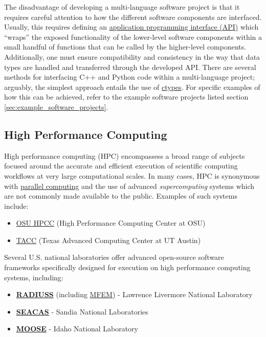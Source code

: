 \documentclass[12pt,a4paper,article,oneside]{memoir} %
\begin{document}
The disadvantage of developing a multi-language software project is that it requires careful attention to how the different software components are interfaced. Usually, this requires defining an \href{https://en.wikipedia.org/wiki/API}{application programming interface (API)} which ``wraps'' the exposed functionality of the lower-level software components within a small handful of functions that can be called by the higher-level components. Additionally, one must ensure compatibility and consistency in the way that data types are handled and transferred through the developed API. There are several methods for interfacing C++ and Python code within a multi-language project; arguably, the simplest approach entails the use of \href{https://docs.python.org/3/library/ctypes.html}{ctypes}. For specific examples of how this can be achieved, refer to the example software projects listed section \ref{sec:example_software_projects}.

\subsection{High Performance Computing}

High performance computing (HPC) encompassess a broad range of subjects focused around the accurate and efficient execution of scientific computing workflows at very large computational scales. In many cases, HPC is synonymous with \href{https://hpc.llnl.gov/documentation/tutorials/introduction-parallel-computing-tutorial}{parallel computing} and the use of advanced \textit{supercomputing} systems which are not commonly made available to the public. Examples of such systems include:
\begin{itemize}
\item \href{https://hpcc.okstate.edu}{OSU HPCC} (High Performance Computing Center at OSU)
\item \href{https://tacc.utexas.edu}{TACC} (Texas Advanced Computing Center at UT Austin)
\end{itemize}

Several U.S. national laboratories offer advanced open-source software frameworks specifically designed for execution on high performance computing systems, including:
\begin{itemize}
\item \href{https://software.llnl.gov/radiuss/}{\textbf{RADIUSS}} (including \href{https://mfem.org}{MFEM}) - Lawrence Livermore National Laboratory
\item \href{https://sandialabs.github.io/seacas-docs/sphinx/html/index.html}{\textbf{SEACAS}} - Sandia National Laboratories
\item \href{https://mooseframework.inl.gov}{\textbf{MOOSE}} - Idaho National Laboratory
\end{itemize}
\end{document}
